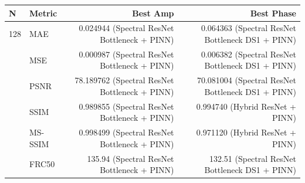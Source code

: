 \begin{tabular}{llrr}
\toprule
N & Metric & Best Amp & Best Phase \\
\midrule
128 & MAE & 0.024944 (Spectral ResNet Bottleneck + PINN) & 0.064363 (Spectral ResNet Bottleneck DS1 + PINN) \\
 & MSE & 0.000987 (Spectral ResNet Bottleneck + PINN) & 0.006382 (Spectral ResNet Bottleneck DS1 + PINN) \\
 & PSNR & 78.189762 (Spectral ResNet Bottleneck + PINN) & 70.081004 (Spectral ResNet Bottleneck DS1 + PINN) \\
 & SSIM & 0.989855 (Spectral ResNet Bottleneck + PINN) & 0.994740 (Hybrid ResNet + PINN) \\
 & MS-SSIM & 0.998499 (Spectral ResNet Bottleneck + PINN) & 0.971120 (Hybrid ResNet + PINN) \\
 & FRC50 & 135.94 (Spectral ResNet Bottleneck + PINN) & 132.51 (Spectral ResNet Bottleneck DS1 + PINN) \\
\bottomrule
\end{tabular}
